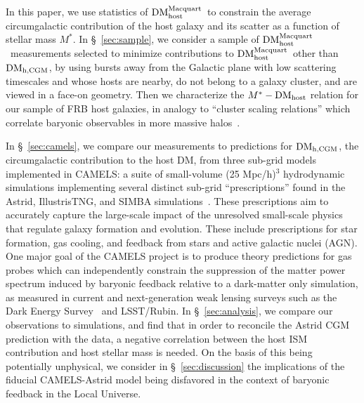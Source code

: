 \documentclass[twocolumn,linenumbers]{aastex631}
\newcommand{\mstar}{\ensuremath{M^*}}
\newcommand{\dmh}{\ensuremath{{\rm DM}_\textrm{host}}}
\newcommand{\dmhm}{\ensuremath{{\rm DM}_\textrm{host}^\textrm{Macquart}}}
\newcommand{\dmhcgm}{\ensuremath{{\rm DM}_\textrm{h,CGM}}}
\begin{document}

In this paper, we use statistics of \dmhm\ to constrain the average circumgalactic contribution of the host galaxy and its scatter as a function of stellar mass \mstar. 
In \S~\ref{sec:sample}, we consider a sample of \dmhm\ measurements selected to minimize contributions to \dmhm\ other than $\dmhcgm$, by using bursts away from the Galactic plane with low scattering timescales and whose hosts are nearby, do not belong to a galaxy cluster, and are viewed in a face-on geometry. Then we characterize the $M^*-\dmh$ relation for our sample of FRB host galaxies, in analogy to ``cluster scaling relations'' which correlate baryonic observables in more massive halos~\citep{battaglia2012on,giodini2013}. 

In \S~\ref{sec:camels}, we compare our measurements to predictions for \dmhcgm, the circumgalactic contribution to the host DM, from three sub-grid models implemented in CAMELS: a suite of small-volume (25 Mpc/h)$^3$ hydrodynamic simulations implementing several distinct sub-grid ``prescriptions'' found in the Astrid, IllustrisTNG, and SIMBA simulations~\citep{camels_presentation, camels_data_release,  camels_data_release2}. 
These prescriptions aim to accurately capture the large-scale impact of the unresolved small-scale physics that regulate galaxy formation and evolution. 
These include prescriptions for star formation, gas cooling, and feedback from stars and active galactic nuclei (AGN). 
One major goal of the CAMELS project is to produce theory predictions for gas probes which can independently constrain the suppression of the matter power spectrum induced by baryonic feedback relative to a dark-matter only simulation, as measured in current and next-generation weak lensing surveys such as the Dark Energy Survey~\citep{chen2023constraining,aric_o2023des} and LSST/Rubin. In \S~\ref{sec:analysis}, we compare our observations to simulations, and find that in order to reconcile the Astrid CGM prediction with the data, a negative correlation between the host ISM contribution and host stellar mass is needed. On the basis of this being potentially unphysical, we consider in \S~\ref{sec:discussion} the implications of the fiducial CAMELS-Astrid model being disfavored in the context of baryonic feedback in the Local Universe.
\end{document}
